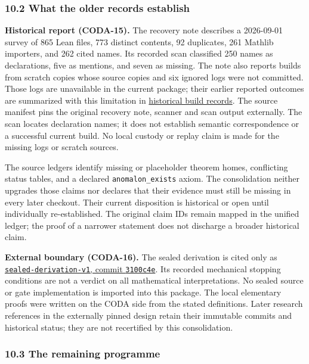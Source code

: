 \documentclass[
  11pt,
]{article}
\begin{document}
\subsubsection{10.2 What the older records establish}\label{what-the-older-records-establish}

\textbf{Historical report (CODA-15).} The recovery note describes a 2026-09-01 survey of 865 Lean files, 773 distinct contents, 92 duplicates, 261 Mathlib importers, and 262 cited names. Its recorded scan classified 250 names as declarations, five as mentions, and seven as missing. The note also reports builds from scratch copies whose source copies and six ignored logs were not committed. Those logs are unavailable in the current package; their earlier reported outcomes are summarized with this limitation in \href{docs/historical_build_logs.md}{historical build records}. The source manifest pins the original recovery note, scanner and scan output externally. The scan locates declaration names; it does not establish semantic correspondence or a successful current build. No local custody or replay claim is made for the missing logs or scratch sources.

The source ledgers identify missing or placeholder theorem homes, conflicting status tables, and a declared \texttt{anomalon\_exists} axiom. The consolidation neither upgrades those claims nor declares that their evidence must still be missing in every later checkout. Their current disposition is historical or open until individually re-established. The original claim IDs remain mapped in the unified ledger; the proof of a narrower statement does not discharge a broader historical claim.

\textbf{External boundary (CODA-16).} The sealed derivation is cited only as \href{https://github.com/dbccpage/19L57G1/tree/3100c4ed5ce70d2b6cff6d2ccd3b0251cf918d0a}{\nolinkurl{sealed-derivation-v1}, commit \texttt{3100c4e}}. Its recorded mechanical stopping conditions are not a verdict on all mathematical interpretations. No sealed source or gate implementation is imported into this package. The local elementary proofs were written on the CODA side from the stated definitions. Later research references in the externally pinned design retain their immutable commits and historical status; they are not recertified by this consolidation.

\subsubsection{10.3 The remaining programme}\label{the-remaining-programme}
\end{document}
